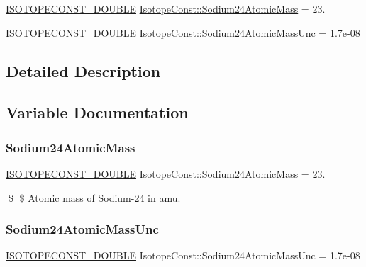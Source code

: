 \begin{DoxyCompactItemize}
\item 
\mbox{\hyperlink{group___isotope_const-_macros_ga8f45a7272ce02c0b4c65c44636ed719a}{I\+S\+O\+T\+O\+P\+E\+C\+O\+N\+S\+T\+\_\+\+D\+O\+U\+B\+LE}} \mbox{\hyperlink{group___isotope_const-_sodium-_na24_ga5c42610633e79f6fb8fb50a0a5ced64e}{Isotope\+Const\+::\+Sodium24\+Atomic\+Mass}} = 23.
\item 
\mbox{\hyperlink{group___isotope_const-_macros_ga8f45a7272ce02c0b4c65c44636ed719a}{I\+S\+O\+T\+O\+P\+E\+C\+O\+N\+S\+T\+\_\+\+D\+O\+U\+B\+LE}} \mbox{\hyperlink{group___isotope_const-_sodium-_na24_ga926b3b0a483f3f6344a6821725f21da5}{Isotope\+Const\+::\+Sodium24\+Atomic\+Mass\+Unc}} = 1.\+7e-\/08
\end{DoxyCompactItemize}


\subsection{Detailed Description}


\subsection{Variable Documentation}
\mbox{\label{group___isotope_const-_sodium-_na24_ga5c42610633e79f6fb8fb50a0a5ced64e}} 
\subsubsection{\texorpdfstring{Sodium24\+Atomic\+Mass}{Sodium24AtomicMass}}
{\footnotesize\ttfamily \mbox{\hyperlink{group___isotope_const-_macros_ga8f45a7272ce02c0b4c65c44636ed719a}{I\+S\+O\+T\+O\+P\+E\+C\+O\+N\+S\+T\+\_\+\+D\+O\+U\+B\+LE}} Isotope\+Const\+::\+Sodium24\+Atomic\+Mass = 23.}

\$ \$ Atomic mass of Sodium-\/24 in amu. \mbox{\label{group___isotope_const-_sodium-_na24_ga926b3b0a483f3f6344a6821725f21da5}} 
\subsubsection{\texorpdfstring{Sodium24\+Atomic\+Mass\+Unc}{Sodium24AtomicMassUnc}}
{\footnotesize\ttfamily \mbox{\hyperlink{group___isotope_const-_macros_ga8f45a7272ce02c0b4c65c44636ed719a}{I\+S\+O\+T\+O\+P\+E\+C\+O\+N\+S\+T\+\_\+\+D\+O\+U\+B\+LE}} Isotope\+Const\+::\+Sodium24\+Atomic\+Mass\+Unc = 1.\+7e-\/08}

